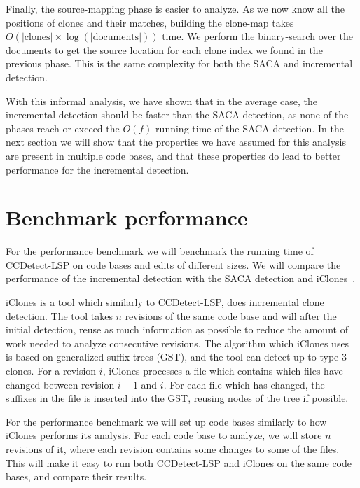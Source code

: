 Finally, the source-mapping phase is easier to analyze. As we now know all the positions
of clones and their matches, building the clone-map takes $O(\vert\text{clones}\vert
\times \log(\vert\text{documents}\vert))$ time. We perform the binary-search over the
documents to get the source location for each clone index we found in the previous phase.
This is the same complexity for both the SACA and incremental detection.

With this informal analysis, we have shown that in the average case, the incremental
detection should be faster than the SACA detection, as none of the phases reach or exceed
the $O(f)$ running time of the SACA detection. In the next section we will show that the
properties we have assumed for this analysis are present in multiple code bases, and that
these properties do lead to better performance for the incremental detection.


\section{Benchmark performance}


For the performance benchmark we will benchmark the running time of CCDetect-LSP on code
bases and edits of different sizes. We will compare the performance of the incremental
detection with the SACA detection and iClones~\cite{GodeIncrementalCloneDetection}.

iClones is a tool which similarly to CCDetect-LSP, does incremental clone detection. The
tool takes $n$ revisions of the same code base and will after the initial detection, reuse
as much information as possible to reduce the amount of work needed to analyze consecutive
revisions. The algorithm which iClones uses is based on generalized suffix trees (GST), and the
tool can detect up to type-3 clones. For a revision $i$, iClones processes a file which
contains which files have changed between revision $i - 1$ and $i$. For each file which
has changed, the suffixes in the file is inserted into the GST, reusing nodes of the tree
if possible.

For the performance benchmark we will set up code bases similarly to how iClones performs
its analysis. For each code base to analyze, we will store $n$ revisions of it, where each
revision contains some changes to some of the files. This will make it easy to run both
CCDetect-LSP and iClones on the same code bases, and compare their results.

